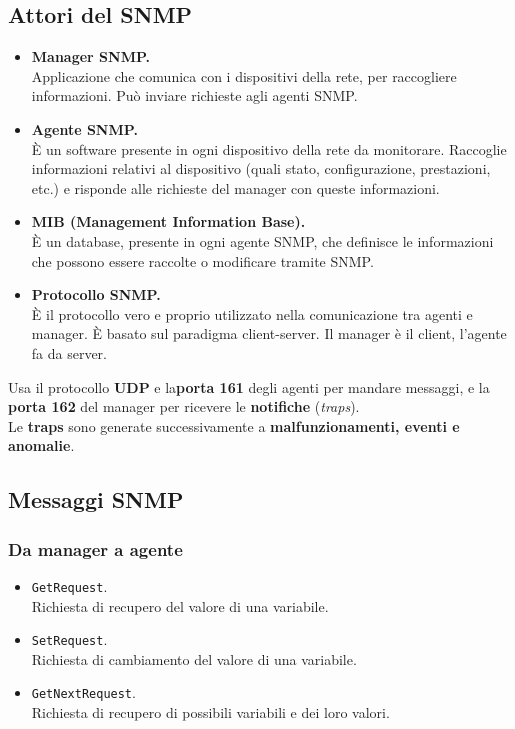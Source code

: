 \subsection{Attori del SNMP}
\begin{itemize}
    \item \textbf{Manager SNMP.}\\
    Applicazione che comunica con i dispositivi della rete, per raccogliere informazioni. Può inviare richieste agli agenti SNMP.
    
    \item \textbf{Agente SNMP.}\\
    È un software presente in ogni dispositivo della rete da monitorare. Raccoglie informazioni relativi al dispositivo (quali stato, configurazione, prestazioni, etc.) e risponde alle richieste del manager con queste informazioni.
    
    \item \textbf{MIB (Management Information Base).}\\
    È un database, presente in ogni agente SNMP, che definisce le informazioni che possono essere raccolte o modificare tramite SNMP.
    
    \item \textbf{Protocollo SNMP.}\\
    È il protocollo vero e proprio utilizzato nella comunicazione tra agenti e manager. È basato sul paradigma client-server. Il manager è il client, l'agente fa da server.
\end{itemize}
Usa il protocollo \textbf{UDP} e la\textbf{porta 161} degli agenti per mandare messaggi, e la \textbf{porta 162} del manager per ricevere le \textbf{notifiche} (\textit{traps}).\\
Le \textbf{traps} sono generate successivamente a \textbf{malfunzionamenti, eventi e anomalie}.

\subsection{Messaggi SNMP}
\subsubsection{Da manager a agente}
\begin{itemize}
    \item \verb|GetRequest|.\\
    Richiesta di recupero del valore di una variabile.
    \item \verb|SetRequest|.\\
    Richiesta di cambiamento del valore di una variabile.
    \item \verb|GetNextRequest|.\\
    Richiesta di recupero di possibili variabili e dei loro valori.
\end{itemize}

